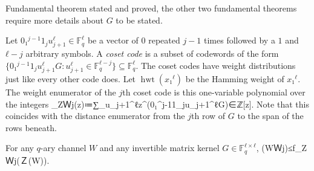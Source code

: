 \documentclass[openany]{amsbook}
\numberwithin{equation}{chapter}
\numberwithin{figure}{chapter}
\numberwithin{table}{chapter}
\DeclareMathOperator\hwt{hwt}
\def\[#1\]{\begin{equation*}{#1}\end{equation*}}
\theoremstyle{definition}	理dfn:Definition~?s			理exa:Example~?s
\theoremstyle{remark}		理cla:Claim~?s				理rem:Remark~?s
\begin{document}
	Fundamental theorem stated and proved,
	the other two fundamental theorems require more details about $G$ to be stated.
	
	Let $0₁^{j-1}1_ju_{j+1}^ℓ∈𝔽_q^ℓ$ be a vector of
	$0$ repeated $j-1$ times followed by a $1$ and $ℓ-j$ arbitrary symbols.
	A \emph{coset code} is a subset of codewords of the form
	$\{0₁^{j-1}1_ju_{j+1}^ℓG:u_{j+1}^ℓ∈𝔽_q^{ℓ-j}\}⊆𝔽_q^ℓ$.
	The coset codes have weight distributions just like every other code does.
	Let $\hwt(x₁^ℓ)$ be the Hamming weight of $x₁^ℓ$.
	The weight enumerator of the $j$th coset code is
	this one-variable polynomial over the integers
	\[f_ZＷj(z)≔∑_{u_{j+1}^ℓ}z^{\hwt(0₁^{j-1}1_ju_{j+1}^ℓG)}∈ℤ[z].\]
	Note that this coincides with the distance enumerator
	from the $j$th row of $G$ to the span of the rows beneath.
	
	\begin{thm}
		\label{thm:ftpcZ}
		For any $q$-ary channel $W$ and any invertible matrix kernel $G∈𝔽_q^{ℓ×ℓ}$,
		\[Ｚ(WＷj)≤f_ZＷj(Ｚ(W)).\]
	\end{thm}
	
\end{document}
